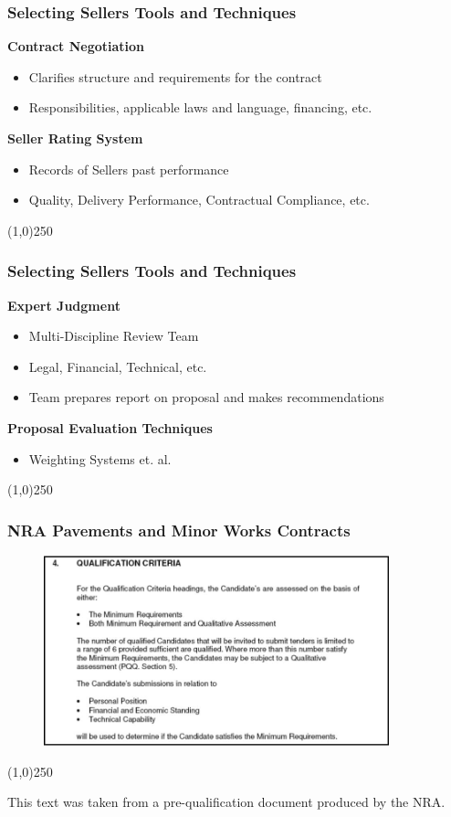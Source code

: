 \begin{frame}
\frametitle{Selecting Sellers \hfill\hfill Tools and Techniques}
\textbf{Contract Negotiation}
\begin{itemize}
	\item Clarifies structure and requirements for the contract
	\item Responsibilities, applicable laws and language, financing, etc. 
\end{itemize}
\textbf{Seller Rating System}
\begin{itemize}
	\item Records of Sellers past performance
	\item Quality, Delivery Performance, Contractual Compliance, etc.
\end{itemize}
\end{frame}\begin{center}\line(1,0){250}\end{center}



\begin{frame}
\frametitle{Selecting Sellers \hfill\hfill Tools and Techniques}
\textbf{Expert Judgment}
\begin{itemize}
	\item Multi-Discipline Review Team
	\item Legal, Financial, Technical, etc.
	\item Team prepares report on proposal and makes recommendations
\end{itemize}
\textbf{Proposal Evaluation Techniques}
\begin{itemize}
	\item Weighting Systems et. al. 
\end{itemize}
\end{frame}\begin{center}\line(1,0){250}\end{center}


\begin{frame}
\frametitle{NRA Pavements and Minor Works Contracts}
\begin{figure}
	\centering
		\includegraphics[width = 10cm]{images/prequal.jpg}
	\label{fig:prequal1}
\end{figure}
\end{frame}\begin{center}\line(1,0){250}\end{center}
This text was taken from a pre-qualification document produced by the NRA. 


